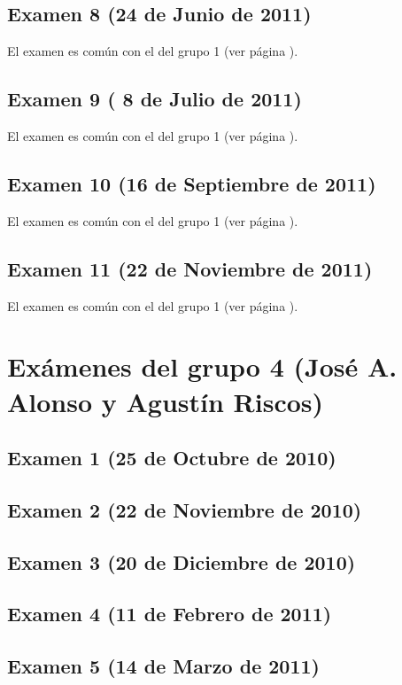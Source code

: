 \documentclass[a4paper,12pt,twoside]{book}
\begin{document}
\subsection{Examen 8 (24 de Junio de 2011)} 
El examen es común con el del grupo 1 (ver página \pageref{examen_10_11_4_8}).
\subsection{Examen 9 ( 8 de Julio de 2011)} 
El examen es común con el del grupo 1 (ver página \pageref{examen_10_11_4_9}).
\subsection{Examen 10 (16 de Septiembre de 2011)} 
El examen es común con el del grupo 1 (ver página \pageref{examen_10_11_4_10}).
\subsection{Examen 11 (22 de Noviembre de 2011)} 
El examen es común con el del grupo 1 (ver página \pageref{examen_10_11_4_11}).

\section{Exámenes del grupo 4 (José A. Alonso y Agustín Riscos)}
\subsection{Examen 1 (25 de Octubre de 2010)}
\subsection{Examen 2 (22 de Noviembre de 2010)}
\subsection{Examen 3 (20 de Diciembre de 2010)}
\subsection{Examen 4 (11 de Febrero de 2011)}
\label{examen_10_11_4_4}
\subsection{Examen 5 (14 de Marzo de 2011)}
\label{examen_10_11_4_5}
\end{document}
